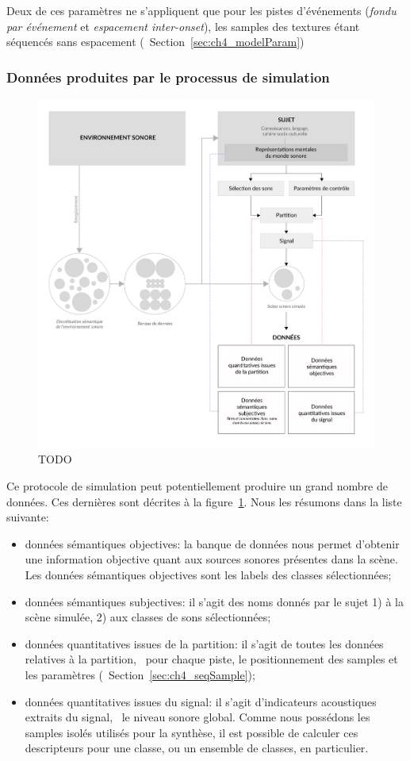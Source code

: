Deux de ces paramètres ne s’appliquent que pour les pistes d'événements (\emph{fondu par événement} et \emph{espacement inter-onset}), les samples des textures étant séquencés sans espacement (\cf~Section~\ref{sec:ch4_modelParam})

\subsubsection{Données produites par le processus de simulation}

\begin{figure}[t]
        \myfloatalign
        \includegraphics[width=.8\linewidth]{gfx/ch_4/schemaXP}
       \caption{TODO}\label{fig:paradigmeSimu2}
\end{figure}

Ce protocole de simulation peut potentiellement produire un grand nombre de données. Ces dernières sont décrites à la figure~\ref{fig:paradigmeSimu2}.  Nous les résumons dans la liste suivante:

\begin{itemize}
\item données sémantiques objectives: la banque de données nous permet d'obtenir une information objective quant aux sources sonores présentes dans la scène. Les données sémantiques objectives sont les labels des classes sélectionnées;
\item données sémantiques subjectives: il s'agit des noms donnés par le sujet 1) à la scène simulée, 2) aux classes de sons sélectionnées;
\item données quantitatives issues de la partition: il s'agit de toutes les données relatives à la partition, \ie~pour chaque piste, le positionnement des samples et les paramètres (\cf~Section~\ref{sec:ch4_seqSample});
\item données quantitatives issues du signal: il s'agit d'indicateurs acoustiques extraits du signal, \eg~le niveau sonore global. Comme nous possédons les samples isolés utilisés pour la synthèse, il est possible de calculer ces descripteurs pour une classe, ou un ensemble de classes, en particulier.
\end{itemize}


